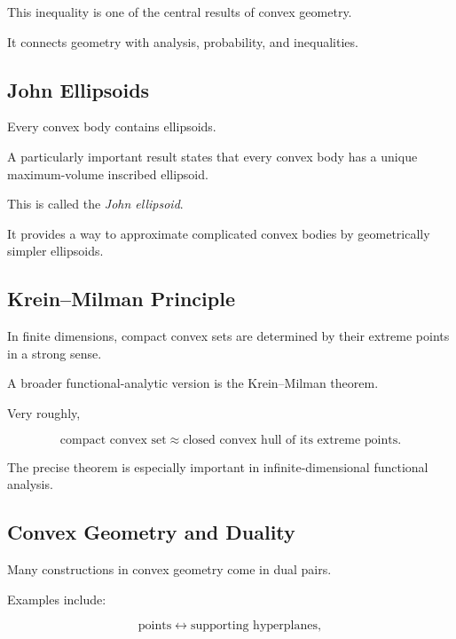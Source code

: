 This inequality is one of the central results of convex geometry.

It connects geometry with analysis, probability, and inequalities.

\subsection{John Ellipsoids}
\label{subsec:john-ellipsoids-preview}

Every convex body contains ellipsoids.

A particularly important result states that every convex body has a unique
maximum-volume inscribed ellipsoid.

This is called the \emph{John ellipsoid}.

It provides a way to approximate complicated convex bodies by geometrically
simpler ellipsoids.

\subsection{Krein--Milman Principle}
\label{subsec:krein-milman-preview}

In finite dimensions, compact convex sets are determined by their extreme
points in a strong sense.

A broader functional-analytic version is the Krein--Milman theorem.

Very roughly,

\[
\boxed{
\text{compact convex set}
\approx
\text{closed convex hull of its extreme points}.
}
\]

The precise theorem is especially important in infinite-dimensional
functional analysis.

\subsection{Convex Geometry and Duality}
\label{subsec:convex-geometric-duality}

Many constructions in convex geometry come in dual pairs.

Examples include:

\[
\boxed{
\text{points}
\longleftrightarrow
\text{supporting hyperplanes},
}
\]

